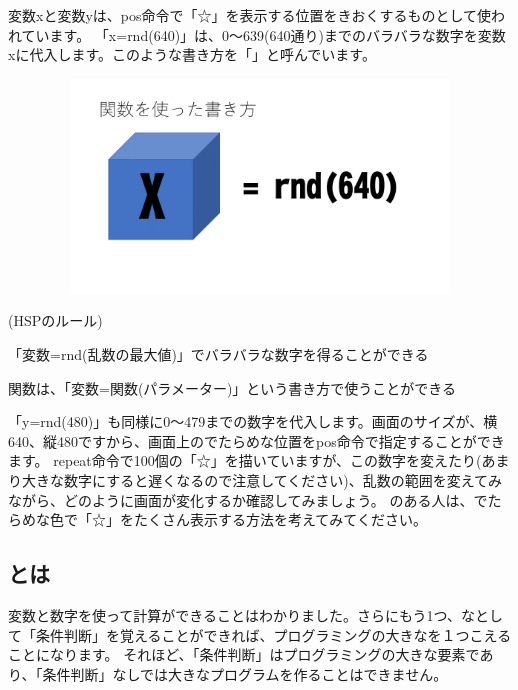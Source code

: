 変数xと変数yは、pos命令で「☆」を表示する位置をきおくするものとして使われています。
「x=rnd(640)」は、0〜639(640通り)までのバラバラな数字を変数xに代入します。このような書き方を「」と呼んでいます。

\begin{figure}[H]
    \begin{center}
        \includegraphics[keepaspectratio,width=11.906cm,height=5.662cm]{text02-img/text02-img048.png}
    \end{center}
\end{figure}

\begin{description}
    \item (HSPのルール)
\end{description}

\begin{description}
    \item 「変数=rnd(乱数の最大値)」でバラバラな数字を得ることができる
    \item 関数は、「変数=関数(パラメーター)」という書き方で使うことができる
\end{description}

「y=rnd(480)」も同様に0〜479までの数字を代入します。画面のサイズが、横640、縦480ですから、画面上のでたらめな位置をpos命令で指定することができます。
repeat命令で100個の「☆」を描いていますが、この数字を変えたり(あまり大きな数字にすると遅くなるので注意してください)、乱数の範囲を変えてみながら、どのように画面が変化するか確認してみましょう。
のある人は、でたらめな色で「☆」をたくさん表示する方法を考えてみてください。

\subsection{とは}

変数と数字を使って計算ができることはわかりました。さらにもう1つ、なとして「条件判断」を覚えることができれば、プログラミングの大きなを１つこえることになります。
それほど、「条件判断」はプログラミングの大きな要素であり、「条件判断」なしでは大きなプログラムを作ることはできません。

